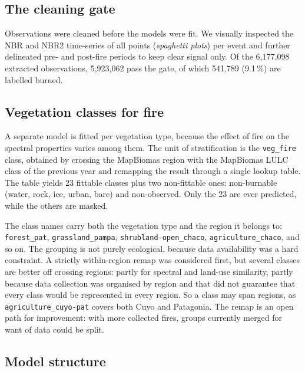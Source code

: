 \documentclass[11pt,a4paper]{article}
\begin{document}
\subsection{The cleaning gate}

Observations were cleaned before the models were fit. We visually inspected the NBR and NBR2 
time-series
of all points (\emph{spaghetti plots}) per event and further delineated pre- and post-fire 
periods to keep clear signal only. 
Of the 6,177,098 extracted observations, 5,923,062 pass the gate, of which 541,789 (9.1\,\%) are
labelled burned. 


\subsection{Vegetation classes for fire}\label{sec-vegfire}

A separate model is fitted per vegetation type, because the effect of fire on the spectral properties
varies among them. The unit of stratification is the \texttt{veg\_fire} class, 
obtained by crossing the MapBiomas
region with the MapBiomas LULC class of the previous year and remapping the result through a
single lookup table. The table yields 23 fittable classes plus two non-fittable ones:
non-burnable (water, rock, ice, urban, bare) and non-observed. Only the 23 are ever predicted,
while the others are masked.

The class names carry both the vegetation type and the region it belongs to:
\texttt{forest\_pat}, \texttt{grassland\_pampa}, \texttt{shrubland-open\_chaco},
\texttt{agriculture\_chaco}, and so on. The grouping is not purely ecological, because data
availability was a hard constraint. A strictly within-region remap was considered first, but
several classes are better off crossing regions: partly for spectral and land-use similarity,
partly because data collection was organised by region and that did not guarantee that every class
would be represented in every region. So a class may span regions, as
\texttt{agriculture\_cuyo-pat} covers both Cuyo and Patagonia. The remap is an open path for
improvement: with more collected fires, groups currently merged for want of data could be split.

\subsection{Model structure}
\end{document}
